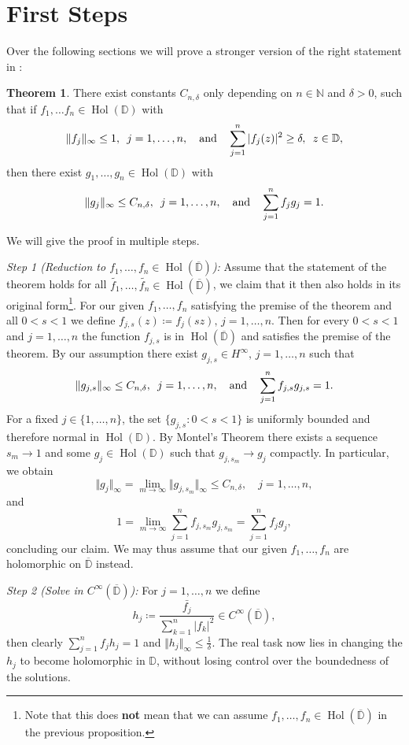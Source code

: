 \documentclass[letterpaper, 11pt]{article}
\newcommand{\D}{\mathbb{D}}
\newcommand{\N}{\mathbb{N}}
\newcommand{\1}{\mathds{1}}
\newcommand{\cl}[1]{\overline{#1}}
\DeclareMathOperator*{\Hol}{Hol}
\theoremstyle{definition}
\newtheorem{theorem}{Theorem}
\newenvironment{innerproof}
 {\renewcommand{\qedsymbol}{}\proof}
 {\endproof}
\begin{document}
\section{First Steps}

Over the following sections we will prove a stronger version of the right statement in :

\begin{theorem}
  There exist constants $C_{n,\delta}$ only depending on $n \in \N$ and $\delta > 0$, such that if $f_1, \dots f_n \in \Hol(\D)$ with
  $$ \Vert f_j \Vert_\infty \leq 1, \hspace{0.5em} j = 1, \dots, n, \quad \textrm{and} \quad \sum_{j=1}^n \vert f_j(z) \vert^2 \geq \delta, \hspace{0.5em} z \in \D, $$
  then there exist $g_1, \dots, g_n \in \Hol(\D)$ with
  $$ \Vert g_j \Vert_\infty \leq C_{n,\delta}, \hspace{0.5em} j = 1, \dots, n, \quad \textrm{and} \quad \sum_{j=1}^n f_j g_j = 1. $$
\end{theorem}

\begin{innerproof}
  We will give the proof in multiple steps.

  \textit{Step 1 (Reduction to $f_1, \dots, f_n \in \Hol(\cl{\D})$):} Assume that the statement of the theorem holds for all $\widetilde{f_1}, \dots, \widetilde{f_n} \in \Hol(\cl{\D})$, we claim that it then also holds in its original form\footnote{Note that this does \textbf{not} mean that we can assume $f_1, \dots, f_n \in \Hol(\cl{\D})$ in the previous proposition.}. For our given $f_1, \dots, f_n$ satisfying the premise of the theorem and all $0 < s < 1$ we define $ f_{j,s}(z) \coloneqq f_{j}(sz), \, j=1,\dots,n $. Then for every $0 < s < 1$ and $j = 1, \dots, n$ the function $f_{j,s}$ is in $\Hol(\cl{\D})$ and satisfies the premise of the theorem. By our assumption there exist $g_{j,s} \in H^\infty, \, j=1,\dots,n$ such that
  $$ \Vert g_{j,s} \Vert_\infty \leq C_{n,\delta}, \hspace{0.5em} j = 1, \dots, n, \quad \textrm{and} \quad \sum_{j=1}^n f_{j,s} g_{j,s} = 1. $$
  For a fixed $j \in \{ 1, \dots, n \}$, the set $\{ g_{j,s} : 0 < s < 1 \}$ is uniformly bounded and therefore normal in $\Hol(\D)$. By Montel's Theorem there exists a sequence $s_m \to 1$ and some $g_j \in \Hol(\D)$ such that $g_{j,s_m} \to g_{j}$ compactly. In particular, we obtain
  $$ \Vert g_j \Vert_\infty = \lim_{m \to \infty} \Vert g_{j,s_m} \Vert_\infty \leq C_{n,\delta}, \quad j=1,\dots,n, $$
  and
  $$ 1 = \lim_{m \to \infty} \sum_{j=1}^n f_{j,s_m} g_{j,s_m} = \sum_{j=1}^n f_j g_j, $$
  concluding our claim. We may thus assume that our given $f_1, \dots, f_n$ are holomorphic on $\cl{\D}$ instead.

  \textit{Step 2 (Solve in $C^\infty(\cl{\D})$):} For $j=1,\dots,n$ we define
  $$ h_j \coloneqq \frac{\bar{f_j}}{\sum_{k=1}^n \vert f_k \vert^2} \in C^\infty(\cl{\D}), $$
  then clearly $ \sum_{j=1}^n f_j h_j = 1$ and $\Vert h_j \Vert_\infty \leq \frac{1}{\delta}$. The real task now lies in changing the $h_j$ to become holomorphic in $\D$, without losing control over the boundedness of the solutions.
\end{innerproof}
\end{document}
